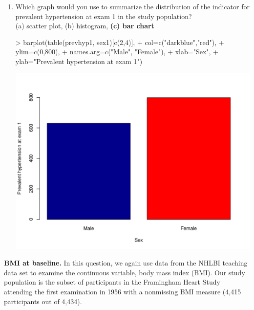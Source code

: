 \documentclass{article}
\begin{document}
\begin{enumerate}
\item Which graph would you use to summarize the distribution of the indicator for prevalent hypertension at exam 1 in the study population?\\
(a) scatter plot, (b) histogram, \textbf{(c) bar chart}

\begin{Schunk}
\begin{Sinput}
> barplot(table(prevhyp1, sex1)[c(2,4)], 
+         col=c("darkblue","red"), 
+         ylim=c(0,800), 
+         names.arg=c("Male", "Female"), 
+         xlab="Sex", 
+         ylab="Prevalent hypertension at exam 1")
\end{Sinput}
\end{Schunk}
\includegraphics{Week1-barchart}
\end{enumerate}
\pagebreak

\textbf{BMI at baseline.} In this question, we again use data from the NHLBI teaching data set to examine the continuous variable, body mass index (BMI). Our study population is the subset of participants in the Framingham Heart Study attending the first examination in 1956 with a nonmissing BMI measure (4,415 participants out of 4,434).  
\end{document}
